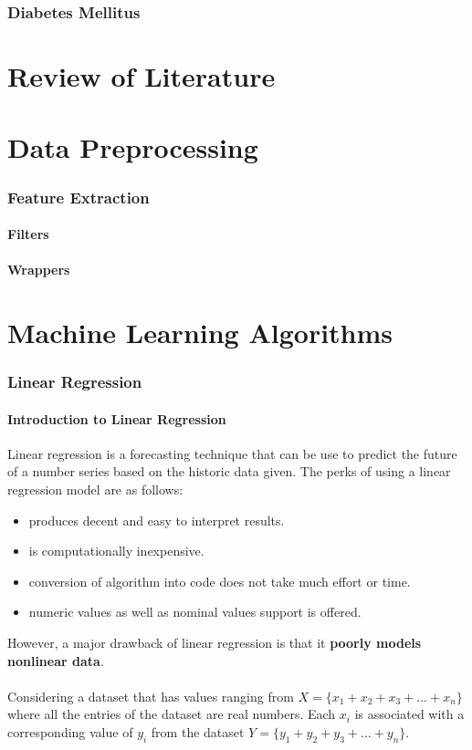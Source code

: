 \documentclass[12pt]{article}
\begin{document}
\newpage
\section{Diabetes Mellitus}


\newpage
\part{Review of Literature}
\newpage
\part{Data Preprocessing}
\section{Feature Extraction}
\subsection{Filters}
\subsection{Wrappers}
\newpage
\part{Machine Learning Algorithms}
\newpage
\section{Linear Regression}
\subsection{Introduction to Linear Regression}
Linear regression is a forecasting technique that can be use to predict the future of a number series based on the historic data given. The perks of using a linear regression model are as follows:

\begin{itemize}
  \item produces decent and  easy to interpret results.
  \item is computationally inexpensive.
  \item conversion of algorithm into code does not take much effort or time.
  \item numeric values as well as nominal values support is offered.
\end{itemize}

However, a major drawback of linear regression is that it \textbf{poorly models nonlinear data}.
\\\\
Considering a dataset that has values ranging from $X = \lbrace x_{1}+x_{2}+x_{3}+...+x_{n} \rbrace$ where
all the entries of the dataset are real numbers. Each $x_{i}$ is associated with a corresponding value of
$y_{i}$ from the dataset $Y = \lbrace y_{1}+y_{2}+y_{3}+...+y_{n} \rbrace$.
\end{document}
